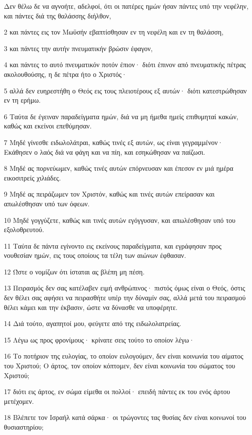 \par Δεν θέλω δε να αγνοήτε, αδελφοί, ότι οι πατέρες ημών ήσαν πάντες υπό την νεφέλην, και πάντες διά της θαλάσσης διήλθον,
\par 2 και πάντες εις τον Μωϋσήν εβαπτίσθησαν εν τη νεφέλη και εν τη θαλάσση,
\par 3 και πάντες την αυτήν πνευματικήν βρώσιν έφαγον,
\par 4 και πάντες το αυτό πνευματικόν ποτόν έπιον· διότι έπινον από πνευματικής πέτρας ακολουθούσης, η δε πέτρα ήτο ο Χριστός·
\par 5 αλλά δεν ευηρεστήθη ο Θεός εις τους πλειοτέρους εξ αυτών· διότι κατεστρώθησαν εν τη ερήμω.
\par 6 Ταύτα δε έγειναν παραδείγματα ημών, διά να μη ήμεθα ημείς επιθυμηταί κακών, καθώς και εκείνοι επεθύμησαν.
\par 7 Μηδέ γίνεσθε ειδωλολάτραι, καθώς τινές εξ αυτών, ως είναι γεγραμμένον· Εκάθησεν ο λαός διά να φάγη και να πίη, και εσηκώθησαν να παίζωσι.
\par 8 Μηδέ ας πορνεύωμεν, καθώς τινές αυτών επόρνευσαν και έπεσον εν μιά ημέρα εικοσιτρείς χιλιάδες.
\par 9 Μηδέ ας πειράζωμεν τον Χριστόν, καθώς και τινές αυτών επείρασαν και απωλέσθησαν υπό των όφεων.
\par 10 Μηδέ γογγύζετε, καθώς και τινές αυτών εγόγγυσαν, και απωλέσθησαν υπό του εξολοθρευτού.
\par 11 Ταύτα δε πάντα εγίνοντο εις εκείνους παραδείγματα, και εγράφησαν προς νουθεσίαν ημών, εις τους οποίους τα τέλη των αιώνων έφθασαν.
\par 12 Ώστε ο νομίζων ότι ίσταται ας βλέπη μη πέση.
\par 13 Πειρασμός δεν σας κατέλαβεν ειμή ανθρώπινος· πιστός όμως είναι ο Θεός, όστις δεν θέλει σας αφήσει να πειρασθήτε υπέρ την δύναμίν σας, αλλά μετά του πειρασμού θέλει κάμει και την έκβασιν, ώστε να δύνασθε να υποφέρητε.
\par 14 Διά τούτο, αγαπητοί μου, φεύγετε από της ειδωλολατρείας.
\par 15 Λέγω ως προς φρονίμους· κρίνατε σεις τούτο το οποίον λέγω·
\par 16 Το ποτήριον της ευλογίας, το οποίον ευλογούμεν, δεν είναι κοινωνία του αίματος του Χριστού; Ο άρτος, τον οποίον κόπτομεν, δεν είναι κοινωνία του σώματος του Χριστού;
\par 17 διότι εις άρτος, εν σώμα είμεθα οι πολλοί· επειδή πάντες εκ του ενός άρτου μετέχομεν.
\par 18 Βλέπετε τον Ισραήλ κατά σάρκα· οι τρώγοντες τας θυσίας δεν είναι κοινωνοί του θυσιαστηρίου;
